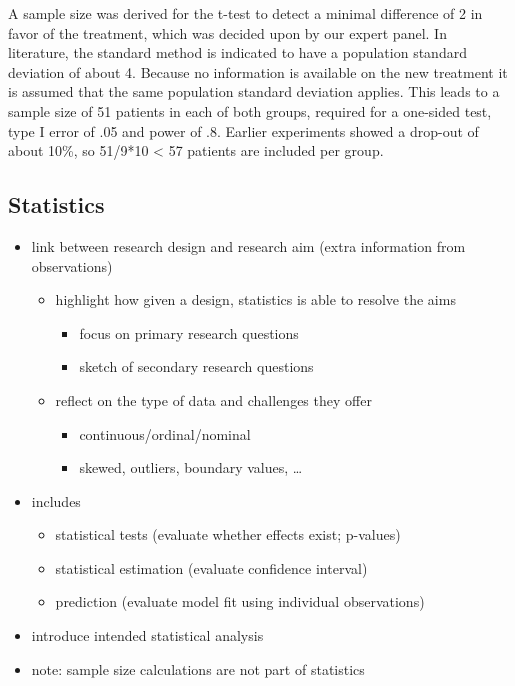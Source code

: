 \documentclass[]{article}
\providecommand{\tightlist}{%
  \setlength{\itemsep}{0pt}\setlength{\parskip}{0pt}}
\begin{document}
A sample size was derived for the t-test to detect a minimal difference
of 2 in favor of the treatment, which was decided upon by our expert
panel. In literature, the standard method is indicated to have a
population standard deviation of about 4. Because no information is
available on the new treatment it is assumed that the same population
standard deviation applies. This leads to a sample size of 51 patients
in each of both groups, required for a one-sided test, type I error of
.05 and power of .8. Earlier experiments showed a drop-out of about
10\%, so 51/9*10 \textless{} 57 patients are included per group.

\newpage

\subsection{Statistics}\label{statistics}

\begin{itemize}
\tightlist
\item
  link between research design and research aim (extra information from
  observations)

  \begin{itemize}
  \tightlist
  \item
    highlight how given a design, statistics is able to resolve the aims

    \begin{itemize}
    \tightlist
    \item
      focus on primary research questions
    \item
      sketch of secondary research questions
    \end{itemize}
  \item
    reflect on the type of data and challenges they offer

    \begin{itemize}
    \tightlist
    \item
      continuous/ordinal/nominal
    \item
      skewed, outliers, boundary values, \ldots{} 
    \end{itemize}
  \end{itemize}
\item
  includes

  \begin{itemize}
  \tightlist
  \item
    statistical tests (evaluate whether effects exist; p-values)
  \item
    statistical estimation (evaluate confidence interval)
  \item
    prediction (evaluate model fit using individual observations)
  \end{itemize}
\item
  introduce intended statistical analysis 
\item
  note: sample size calculations are not part of statistics
\end{itemize}
\end{document}
